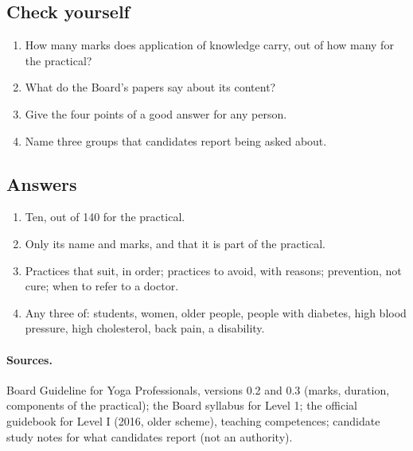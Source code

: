 \subsection*{Check yourself}
\begin{enumerate}
\item How many marks does application of knowledge carry, out of how many for the practical?
\item What do the Board's papers say about its content?
\item Give the four points of a good answer for any person.
\item Name three groups that candidates report being asked about.
\end{enumerate}

\subsection*{Answers}
\begin{enumerate}
\item Ten, out of 140 for the practical.
\item Only its name and marks, and that it is part of the practical.
\item Practices that suit, in order; practices to avoid, with reasons; prevention, not cure; when to refer to a doctor.
\item Any three of: students, women, older people, people with diabetes, high blood pressure, high cholesterol, back pain, a disability.
\end{enumerate}

\paragraph{Sources.} Board Guideline for Yoga Professionals, versions 0.2 and 0.3 (marks, duration, components of the practical); the Board syllabus for Level 1; the official guidebook for Level I (2016, older scheme), teaching competences; candidate study notes for what candidates report (not an authority).
